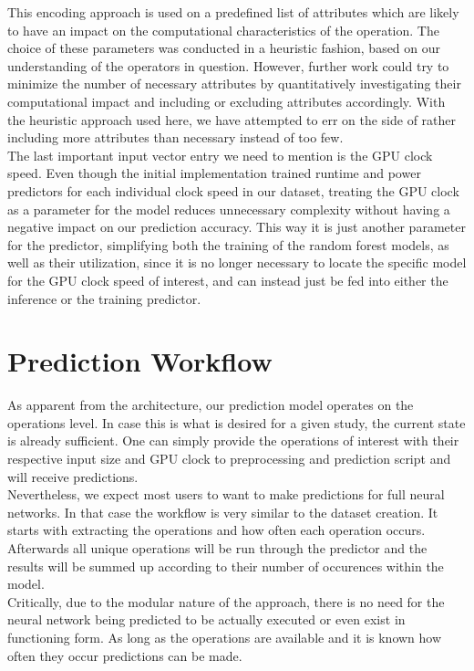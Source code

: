 This encoding approach is used on a predefined list of attributes which are likely to have an impact on the computational characteristics of the operation. The choice of these parameters was conducted in a heuristic fashion, based on our understanding of the operators in question. However, further work could try to minimize the number of necessary attributes by quantitatively investigating their computational impact and including or excluding attributes accordingly. With the heuristic approach used here, we have attempted to err on the side of rather including more attributes than necessary instead of too few. \\
The last important input vector entry we need to mention is the GPU clock speed. Even though the initial implementation trained runtime and power predictors for each individual clock speed in our dataset, treating the GPU clock as a parameter for the model reduces unnecessary complexity without having a negative impact on our prediction accuracy. This way it is just another parameter for the predictor, simplifying both the training of the random forest models, as well as their utilization, since it is no longer necessary to locate the specific model for the GPU clock speed of interest, and can instead just be fed into either the inference or the training predictor.



\section{Prediction Workflow}
As apparent from the architecture, our prediction model operates on the operations level. In case this is what is desired for a given study, the current state is already sufficient. One can simply provide the operations of interest with their respective input size and GPU clock to preprocessing and prediction script and will receive predictions. \\
Nevertheless, we expect most users to want to make predictions for full neural networks. In that case the workflow is very similar to the dataset creation. It starts with extracting the operations and how often each operation occurs. Afterwards all unique operations will be run through the predictor and the results will be summed up according to their number of occurences within the model.\\
Critically, due to the modular nature of the approach, there is no need for the neural network being predicted to be actually executed or even exist in functioning form. As long as the operations are available and it is known how often they occur predictions can be made.